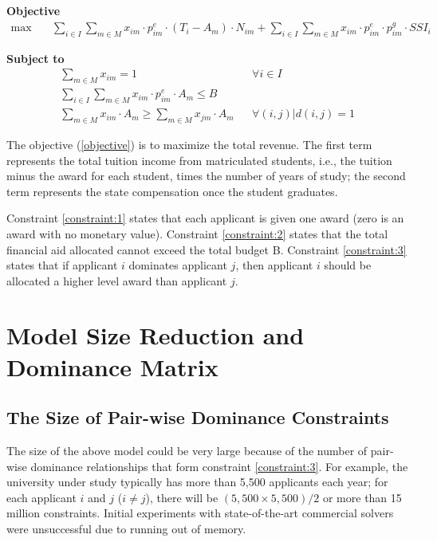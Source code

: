 \documentclass[12pt,english]{report}
\begin{document}
\hspace{-0.5cm}\textbf{Objective}
\begin{align}
\max \quad
& \sum_{i\in I} \sum_{m\in M} x_{im}\cdot p^e_{im}\cdot(T_i-A_m)\cdot N_{im}+
\sum_{i\in I} \sum_{m\in M} x_{im}\cdot p^e_{im} \cdot p^g_{im}\cdot SSI_i
\label{objective}
\end{align}

\hspace{-0.55cm}\textbf{Subject to}
\begin{align}
\sum_{m \in M}x_{im}=1 &&   \forall i\in I \label{constraint:1}  \\
\sum_{i \in I} \sum_{m\in M} x_{im}\cdot p^e_{im}\cdot A_m\leq B
\label{constraint:2}  \\
\sum_{m \in M} x_{im}\cdot A_m \geq \sum_{m \in M} x_{jm}\cdot A_m && \forall
(i,j)|d(i,j)=1 \label{constraint:3}
\end{align}

The objective (\ref{objective}) is to maximize the total revenue. The first term represents the total tuition income from matriculated students, i.e., the tuition minus the award for each student, times the number of years of study; the second term represents the state compensation once the student graduates.

Constraint \ref{constraint:1}  states that each applicant is given one award (zero is an award with no monetary value). Constraint \ref{constraint:2} states that the total financial aid allocated cannot exceed the total budget B. Constraint  \ref{constraint:3} states that if applicant $i$ dominates applicant $j$, then applicant $i$ should be allocated a higher level award than applicant $j$.

\section{Model Size Reduction and Dominance Matrix}

\subsection{The Size of Pair-wise Dominance Constraints}
\noindent The size of the above model could be very large because of the number of pair-wise dominance relationships that form constraint \ref{constraint:3}.  For example, the university under study typically has more than 5,500 applicants each year; for each applicant $i$ and $j$ ($i \neq j$), there will be $(5,500 \times 5,500) / 2$ or more than 15 million constraints. Initial experiments with state-of-the-art commercial solvers were unsuccessful due to running out of memory.
\end{document}
